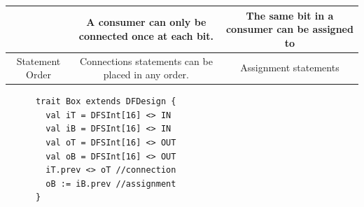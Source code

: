 \begin{table}[t]
\begin{tabular}{|c|c|c|}
    &
    \begin{minipage}[c][1cm]{0.42\textwidth}
      A consumer can only be connected once at each bit.
    \end{minipage} 
    &  
    \begin{minipage}[c][1cm]{0.42\textwidth}
      The same bit in a consumer can be assigned to 
    \end{minipage} 
    \\ 
    \hline
    \begin{minipage}{0.1\textwidth}
      \flushleft
      Statement Order
    \end{minipage} 
    &
    \begin{minipage}[c][1cm]{0.42\textwidth}
      Connections statements can be placed in any order.
    \end{minipage} 
    &  
    \begin{minipage}[c][1cm]{0.42\textwidth}
      Assignment statements
    \end{minipage} 
    \\ 
    \hline
  \end{tabular}%
  \vspace{3ex}
  \begin{minipage}[t][9cm][t]{0.34\linewidth}
    \centering
    \captionsetup{justification=centering}    
    \begin{verbatim}
      trait Box extends DFDesign {
        val iT = DFSInt[16] <> IN
        val iB = DFSInt[16] <> IN
        val oT = DFSInt[16] <> OUT
        val oB = DFSInt[16] <> OUT
        iT.prev <> oT //connection
        oB := iB.prev //assignment
      }
      
      
      

\end{verbatim}
\end{minipage}
\end{table}
